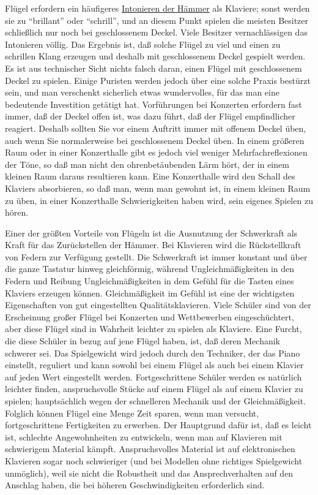 Flügel erfordern ein häufigeres \hyperref[c2_7_hamm]{Intonieren der Hämmer} als Klaviere; sonst werden sie zu \enquote{brillant} oder \enquote{schrill}, und an diesem Punkt spielen die meisten Besitzer schließlich nur noch bei geschlossenem Deckel.
Viele Besitzer vernachlässigen das Intonieren völlig.
Das Ergebnis ist, daß solche Flügel zu viel und einen zu schrillen Klang erzeugen und deshalb mit geschlossenem Deckel gespielt werden.
Es ist aus technischer Sicht nichts falsch daran, einen Flügel mit geschlossenem Deckel zu spielen.
Einige Puristen werden jedoch über eine solche Praxis bestürzt sein, und man verschenkt sicherlich etwas wundervolles, für das man eine bedeutende Investition getätigt hat.
Vorführungen bei Konzerten erfordern fast immer, daß der Deckel offen ist, was dazu führt, daß der Flügel empfindlicher reagiert.
Deshalb sollten Sie vor einem Auftritt immer mit offenem Deckel üben, auch wenn Sie normalerweise bei geschlossenem Deckel üben.
In einem größeren Raum oder in einer Konzerthalle gibt es jedoch viel weniger Mehrfachreflexionen der Töne, so daß man nicht den ohrenbetäubenden Lärm hört, der in einem kleinen Raum daraus resultieren kann.
Eine Konzerthalle wird den Schall des Klaviers absorbieren, so daß man, wenn man gewohnt ist, in einem kleinen Raum zu üben, in einer Konzerthalle Schwierigkeiten haben wird, sein eigenes Spielen zu hören.

Einer der größten Vorteile von Flügeln ist die Ausnutzung der Schwerkraft als Kraft für das Zurückstellen der Hämmer.
Bei Klavieren wird die Rückstellkraft von Federn zur Verfügung gestellt.
Die Schwerkraft ist immer konstant und über die ganze Tastatur hinweg gleichförmig, während Ungleichmäßigkeiten in den Federn und Reibung Ungleichmäßigkeiten in dem Gefühl für die Tasten eines Klaviers erzeugen können.
Gleichmäßigkeit im Gefühl ist eine der wichtigsten Eigenschaften von gut eingestellten Qualitätsklavieren.
Viele Schüler sind von der Erscheinung großer Flügel bei Konzerten und Wettbewerben eingeschüchtert, aber diese Flügel sind in Wahrheit leichter zu spielen als Klaviere.
Eine Furcht, die diese Schüler in bezug auf jene Flügel haben, ist, daß deren Mechanik schwerer sei.
Das Spielgewicht wird jedoch durch den Techniker, der das Piano einstellt, reguliert und kann sowohl bei einem Flügel als auch bei einem Klavier auf jeden Wert eingestellt werden.
Fortgeschrittene Schüler werden es natürlich leichter finden, anspruchsvolle Stücke auf einem Flügel als auf einem Klavier zu spielen; hauptsächlich wegen der schnelleren Mechanik und der Gleichmäßigkeit.
Folglich können Flügel eine Menge Zeit sparen, wenn man versucht, fortgeschrittene Fertigkeiten zu erwerben.
Der Hauptgrund dafür ist, daß es leicht ist, schlechte Angewohnheiten zu entwickeln, wenn man auf Klavieren mit schwierigem Material kämpft.
Anspruchsvolles Material ist auf elektronischen Klavieren sogar noch schwieriger (und bei Modellen ohne richtiges Spielgewicht unmöglich), weil sie nicht die Robustheit und das Ansprechverhalten auf den Anschlag haben, die bei höheren Geschwindigkeiten erforderlich sind.


